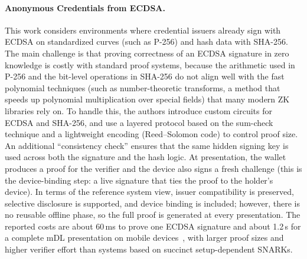 \paragraph{Anonymous Credentials from ECDSA.~\cite{cryptoeprint:2024/2010}}
This work considers environments where credential issuers already sign with ECDSA on standardized curves (such as P-256) and hash data with SHA-256.
The main challenge is that proving correctness of an ECDSA signature in zero knowledge is costly with standard proof systems, because the arithmetic used in P-256 and the bit-level operations in SHA-256 do not align well with the fast polynomial techniques (such as number-theoretic transforms, a method that speeds up polynomial multiplication over special fields) that many modern ZK libraries rely on.
To handle this, the authors introduce custom circuits for ECDSA and SHA-256, and use a layered protocol based on the sum-check technique and a lightweight encoding (Reed–Solomon code) to control proof size.
An additional “consistency check” ensures that the same hidden signing key is used across both the signature and the hash logic.
At presentation, the wallet produces a proof for the verifier and the device also signs a fresh challenge (this is the device-binding step: a live signature that ties the proof to the holder’s device).
In terms of the reference system view, issuer compatibility is preserved, selective disclosure is supported, and device binding is included; however, there is no reusable offline phase, so the full proof is generated at every presentation. The reported costs are about 60\,ms to prove one ECDSA signature and about 1.2\,s for a complete mDL presentation on mobile devices~\cite[\S5.3,\S6.2]{cryptoeprint:2024/2010}, with larger proof sizes and higher verifier effort than systems based on succinct setup-dependent SNARKs.

